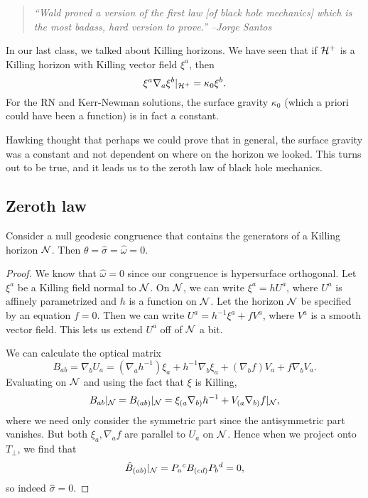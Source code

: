 \begin{quote}
    \textit{``Wald proved a version of the first law [of black hole mechanics] which is the most badass, hard version to prove.'' --Jorge Santos}
\end{quote}

In our last class, we talked about Killing horizons. We have seen that if $\mathcal H^+$ is a Killing horizon with Killing vector field $\xi^a$, then
\begin{equation}
    \xi^a \nabla_a \xi^b|_{\mathcal H^+} = \kappa_0 \xi^b.
\end{equation}
For the RN and Kerr-Newman solutions, the surface gravity $\kappa_0$ (which a priori could have been a function) is in fact a constant.

Hawking thought that perhaps we could prove that in general, the surface gravity was a constant and not dependent on where on the horizon we looked. This turns out to be true, and it leads us to the zeroth law of black hole mechanics.

\subsection*{Zeroth law}
\begin{prop}
    Consider a null geodesic congruence that contains the generators of a Killing horizon $\mathcal N$. Then $\theta=\hat \sigma =\hat \omega=0$.
\end{prop}
\begin{proof}
    We know that $\hat \omega=0$ since our congruence is hypersurface orthogonal. %
    Let $\xi^a$ be a Killing field normal to $\mathcal N$. On $\mathcal N$, we can write $\xi^a= hU^a$, where $U^a$ is affinely parametrized and $h$ is a function on $\mathcal N$.
    Let the horizon $\mathcal N$ be specified by an equation $f=0$. Then we can write $U^a=h^{-1} \xi^a + f V^a$, where $V^a$ is a smooth vector field. This lets us extend $U^a$ off of $\mathcal N$ a bit.
    
    We can calculate the optical matrix
    \begin{equation}
        B_{ab}=\nabla_b U_a = (\nabla_a h^{-1})\xi_a + h^{-1} \nabla_b \xi_a + (\nabla_b f)V_a +f \nabla_b V_a.
    \end{equation}
    Evaluating on $\mathcal N$ and using the fact that $\xi$ is Killing,
    \begin{equation}
        B_{ab}|_\mathcal N= B_{(ab)}|_\mathcal N = \xi_{(a}\nabla_{b)} h^{-1} + V_{(a}\nabla_{b)}f|_{\mathcal N},
    \end{equation}
    where we need only consider the symmetric part since the antisymmetric part vanishes. But both $\xi_a,\nabla_a f$ are parallel to $U_a$ on $\mathcal N$. Hence when we project onto $T_\perp$, we find that
    \begin{equation}
        \hat B_{(ab)}|_\mathcal N = P_a{}^c B_{(cd)} P_b{}^d = 0,
    \end{equation}
    so indeed $\hat \sigma=0$.
\end{proof}

